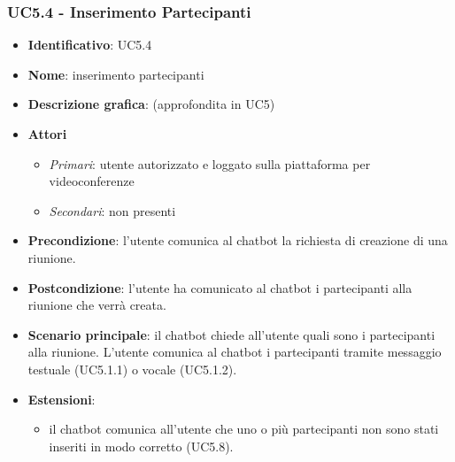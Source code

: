 \subsubsection{UC5.4 - Inserimento Partecipanti}
\begin{itemize}
    \item \textbf{Identificativo}: UC5.4
    \item \textbf{Nome}: inserimento partecipanti
    \item \textbf{Descrizione grafica}: (approfondita in UC5)
    \item \textbf{Attori}
 \begin{itemize} 
    \item \textit{Primari}: utente autorizzato e loggato sulla piattaforma per videoconferenze
    \item \textit{Secondari}: non presenti
 \end{itemize}
 \item \textbf{Precondizione}: l'utente comunica al chatbot la richiesta di creazione di una riunione.
 \item \textbf{Postcondizione}: l'utente ha comunicato al chatbot i partecipanti alla riunione che verrà creata.
 \item \textbf{Scenario principale}: il chatbot chiede all'utente quali sono i partecipanti alla riunione. L'utente comunica al chatbot i partecipanti tramite messaggio testuale (UC5.1.1) o vocale (UC5.1.2).
 \item \textbf{Estensioni}: 
 \begin{itemize} 
    \item il chatbot comunica all'utente che uno o più partecipanti non sono stati inseriti in modo corretto (UC5.8).
 \end{itemize}
\end{itemize}

